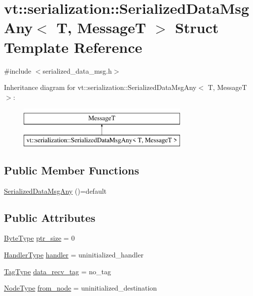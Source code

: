 \hypertarget{structvt_1_1serialization_1_1_serialized_data_msg_any}{}\section{vt\+:\+:serialization\+:\+:Serialized\+Data\+Msg\+Any$<$ T, MessageT $>$ Struct Template Reference}
\label{structvt_1_1serialization_1_1_serialized_data_msg_any}


{\ttfamily \#include $<$serialized\+\_\+data\+\_\+msg.\+h$>$}

Inheritance diagram for vt\+:\+:serialization\+:\+:Serialized\+Data\+Msg\+Any$<$ T, MessageT $>$\+:\begin{figure}[H]
\begin{center}
\leavevmode
\includegraphics[height=2.000000cm]{structvt_1_1serialization_1_1_serialized_data_msg_any}
\end{center}
\end{figure}
\subsection*{Public Member Functions}
\begin{DoxyCompactItemize}
\item 
\hyperlink{structvt_1_1serialization_1_1_serialized_data_msg_any_abeedde83aef6f281849634198e997a78}{Serialized\+Data\+Msg\+Any} ()=default
\end{DoxyCompactItemize}
\subsection*{Public Attributes}
\begin{DoxyCompactItemize}
\item 
\hyperlink{namespacevt_aab8d55968084610ce3b17057981e9300}{Byte\+Type} \hyperlink{structvt_1_1serialization_1_1_serialized_data_msg_any_a756d93ea71e8c3f0ec849f49e19cac98}{ptr\+\_\+size} = 0
\item 
\hyperlink{namespacevt_af64846b57dfcaf104da3ef6967917573}{Handler\+Type} \hyperlink{structvt_1_1serialization_1_1_serialized_data_msg_any_ab6711d57897e86d9ea0c5587fee75eff}{handler} = uninitialized\+\_\+handler
\item 
\hyperlink{namespacevt_a84ab281dae04a52a4b243d6bf62d0e52}{Tag\+Type} \hyperlink{structvt_1_1serialization_1_1_serialized_data_msg_any_af731100b67b3186dbb76fbcff39be3f0}{data\+\_\+recv\+\_\+tag} = no\+\_\+tag
\item 
\hyperlink{namespacevt_a866da9d0efc19c0a1ce79e9e492f47e2}{Node\+Type} \hyperlink{structvt_1_1serialization_1_1_serialized_data_msg_any_aca0ea3cc0037b1d171d610a44a2b8e43}{from\+\_\+node} = uninitialized\+\_\+destination
\end{DoxyCompactItemize}


